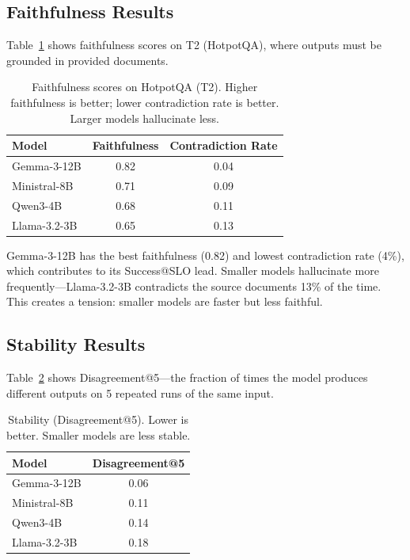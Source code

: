 \documentclass[11pt]{article}
\begin{document}
\subsection{Faithfulness Results}

Table~\ref{tab:faithfulness} shows faithfulness scores on T2 (HotpotQA), where outputs must be grounded in provided documents.

\begin{table}[t]
\centering
\caption{Faithfulness scores on HotpotQA (T2). Higher faithfulness is better; lower contradiction rate is better. Larger models hallucinate less.}
\label{tab:faithfulness}
\begin{tabular}{lcc}
\toprule
\textbf{Model} & \textbf{Faithfulness} & \textbf{Contradiction Rate} \\
\midrule
Gemma-3-12B & 0.82 & 0.04 \\
Ministral-8B & 0.71 & 0.09 \\
Qwen3-4B & 0.68 & 0.11 \\
Llama-3.2-3B & 0.65 & 0.13 \\
\bottomrule
\end{tabular}
\end{table}

Gemma-3-12B has the best faithfulness (0.82) and lowest contradiction rate (4\%), which contributes to its Success@SLO lead.
Smaller models hallucinate more frequently---Llama-3.2-3B contradicts the source documents 13\% of the time.
This creates a tension: smaller models are faster but less faithful.

\subsection{Stability Results}

Table~\ref{tab:stability} shows Disagreement@5---the fraction of times the model produces different outputs on 5 repeated runs of the same input.

\begin{table}[t]
\centering
\caption{Stability (Disagreement@5). Lower is better. Smaller models are less stable.}
\label{tab:stability}
\begin{tabular}{lc}
\toprule
\textbf{Model} & \textbf{Disagreement@5} \\
\midrule
Gemma-3-12B & 0.06 \\
Ministral-8B & 0.11 \\
Qwen3-4B & 0.14 \\
Llama-3.2-3B & 0.18 \\
\bottomrule
\end{tabular}
\end{table}
\end{document}

